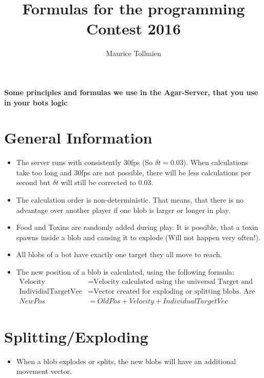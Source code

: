\documentclass[10pt,a4paper]{article}
\author{Maurice Tollmien}
\title{Formulas for the programming Contest 2016}
\begin{document}
\thispagestyle{empty}
\begin{center}
\textbf{\large{Some principles and formulas we use in the Agar-Server, that you use in your bots logic}}
\end{center}

\section{General Information}
\begin{itemize}
\item The server runs with consistently 30fps (So $\delta t = 0.03$). \newline
      When calculations take too long and 30fps are not possible, there will be less calculations per second
      but $\delta t$ will still be corrected to 0.03.
\item The calculation order is non-deterministic. That means, that there is no advantage over another player 
	  if one blob is larger or longer in play.
\item Food and Toxins are randomly added during play. It is possible, that a toxin spawns 
      inside a blob and causing it to explode (Will not happen very often!).
\item All blobs of a bot have exactly one target they all move to reach.
\item The new position of a blob is calculated, using the following formula:
	  \begin{align*}	  
      \text{Velocity}            &= \text{Velocity calculated using the universal Target and Mass.}\\
      \text{IndividialTargetVec} &= \text{Vector created for exploding or splitting blobs. Are only temporary.}\\
      NewPos              &= OldPos + Velocity + IndividualTargetVec
      \end{align*}
\end{itemize}      
      
      
\section{Splitting/Exploding}
\begin{itemize}
\item When a blob explodes or splits, the new blobs will have
      an additional movement vector.
\end{itemize}
      
\end{document}
